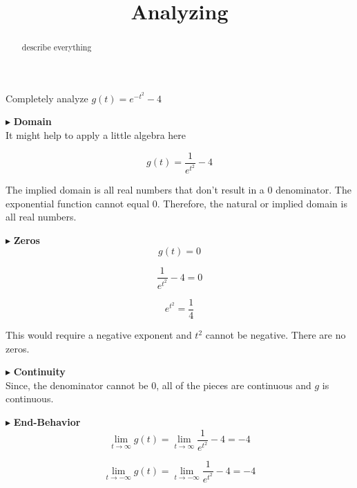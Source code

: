 \documentclass{ximera}
\title{Analyzing}
\begin{document}
\begin{abstract}
describe everything
\end{abstract}
\maketitle







Completely analyze $g(t) = e^{-t^2} - 4$

$\blacktriangleright$  \textbf{\textcolor{blue!55!black}{Domain}} \\


It might help to apply a little algebra here


\[
g(t) = \frac{1}{e^{t^2}} - 4
\]


The implied domain is all real numbers that don't result in a $0$ denominator. The exponential function cannot equal $0$.  Therefore, the natural or implied domain is all real numbers.







$\blacktriangleright$  \textbf{\textcolor{blue!55!black}{Zeros}} \\

\[
g(t) = 0
\]



\[
\frac{1}{e^{t^2}} - 4 = 0
\]


\[
e^{t^2} = \frac{1}{4}
\]


This would require a negative exponent and $t^2$ cannot be negative.  There are no zeros.






$\blacktriangleright$  \textbf{\textcolor{blue!55!black}{Continuity}} \\


Since, the denominator cannot be $0$, all of the pieces are continuous and $g$ is continuous.





$\blacktriangleright$  \textbf{\textcolor{blue!55!black}{End-Behavior}} \\


\[   \lim\limits_{t \to \infty} g(t) =  \lim\limits_{t \to \infty}  \frac{1}{e^{t^2}} - 4 = -4\]


\[   \lim\limits_{t \to -\infty} g(t) =  \lim\limits_{t \to -\infty}  \frac{1}{e^{t^2}} - 4 = -4\]
\end{document}
